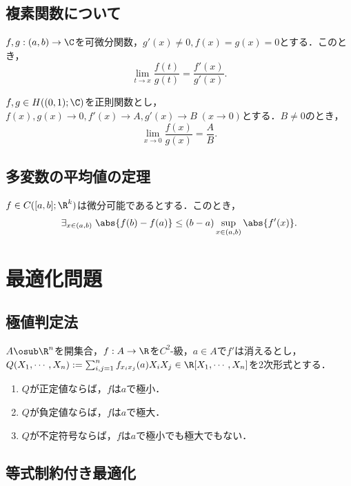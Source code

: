 \documentclass[uplatex, dvipdfmx]{jsreport}
\begin{document}
\subsection{複素関数について}

\begin{proposition}[複素関数にも成り立つ消息]
    $f,g:(a,b)\to\C$を可微分関数，$g'(x)\ne0,f(x)=g(x)=0$とする．このとき，
    \[\lim_{t\to x}\frac{f(t)}{g(t)}=\frac{f'(x)}{g'(x)}.\]
\end{proposition}

\begin{proposition}
    $f,g\in H((0,1);\C)$を正則関数とし，$f(x),g(x)\to0,f'(x)\to A,g'(x)\to B\;(x\to0)$とする．$B\ne0$のとき，
    \[\lim_{x\to0}\frac{f(x)}{g(x)}=\frac{A}{B}.\]
\end{proposition}

\subsection{多変数の平均値の定理}

\begin{theorem}
    $f\in C([a,b];\R^k)$は微分可能であるとする．このとき，
    \[\exists_{x\in(a,b)}\;\abs{f(b)-f(a)}\le(b-a)\sup_{x\in(a,b)}\abs{f'(x)}.\]
\end{theorem}

\section{最適化問題}

\subsection{極値判定法}

\begin{theorem}
    $A\osub\R^n$を開集合，$f:A\to\R$を$C^2$-級，$a\in A$で$f'$は消えるとし，$Q(X_1,\cdots,X_n):=\sum^n_{i,j=1}f_{x_ix_j}(a)X_iX_j\in\R[X_1,\cdots,X_n]$を2次形式とする．
    \begin{enumerate}
        \item $Q$が正定値ならば，$f$は$a$で極小．
        \item $Q$が負定値ならば，$f$は$a$で極大．
        \item $Q$が不定符号ならば，$f$は$a$で極小でも極大でもない．
    \end{enumerate}
\end{theorem}

\subsection{等式制約付き最適化}
\end{document}
